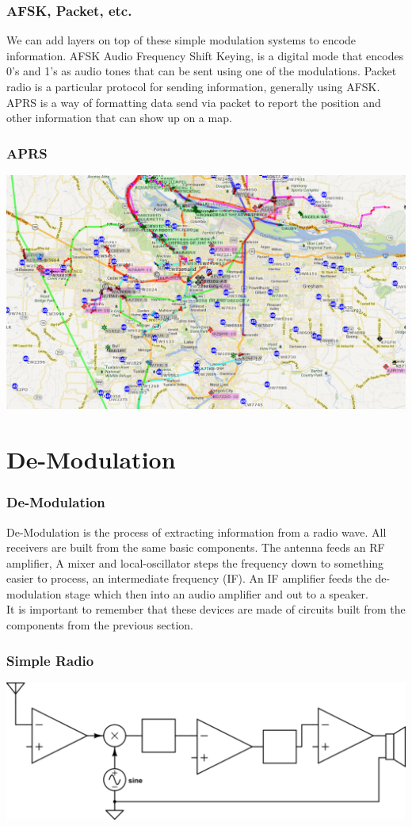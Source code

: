 \documentclass[10pt, handout]{beamer}
\begin{document}
\begin{frame}
\frametitle{AFSK, Packet, etc.}
We can add layers on top of these simple modulation systems to encode information. AFSK Audio Frequency Shift Keying, is a digital mode that encodes 0's and 1's as audio tones that can be sent using one of the modulations. Packet radio is a particular protocol for sending information, generally using AFSK. APRS is a way of formatting data send via packet to report the position and other information that can show up on a map.
\end{frame}

\begin{frame}
\frametitle{APRS}
\includegraphics[width=.9\textwidth]{aprspdx.png}
\end{frame}
\section{De-Modulation}

\begin{frame}
\frametitle{De-Modulation}
De-Modulation is the process of extracting information from a radio wave. All receivers are built from the same basic components. The antenna feeds an RF amplifier, A mixer and local-oscillator steps the frequency down to something easier to process, an intermediate frequency (IF). An IF amplifier feeds the de-modulation stage which then into an audio amplifier and out to a speaker. 
\\
It is important to remember that these devices are made of circuits built from the components from the previous section.
\end{frame}

\begin{frame}
\frametitle{Simple Radio}
\includegraphics[width=.9\textwidth]{simplereciever.png}
\end{frame}
\end{document}
